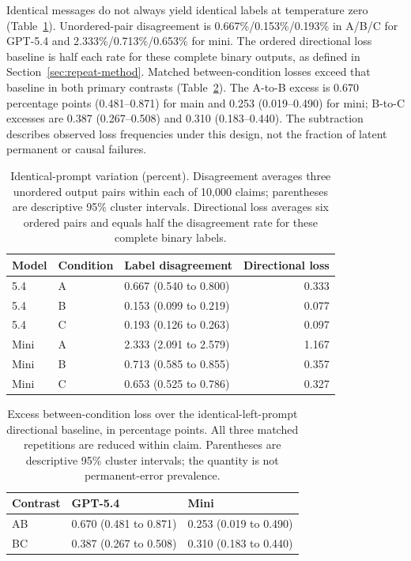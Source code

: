 \documentclass[11pt,letterpaper]{article}
\begin{document}
Identical messages do not always yield identical labels at temperature zero (Table~\ref{tab:variability}). Unordered-pair disagreement is 0.667\%/0.153\%/0.193\% in A/B/C for GPT-5.4 and 2.333\%/0.713\%/0.653\% for mini. The ordered directional loss baseline is half each rate for these complete binary outputs, as defined in Section~\ref{sec:repeat-method}. Matched between-condition losses exceed that baseline in both primary contrasts (Table~\ref{tab:excess}). The A-to-B excess is 0.670 percentage points (0.481--0.871) for main and 0.253 (0.019--0.490) for mini; B-to-C excesses are 0.387 (0.267--0.508) and 0.310 (0.183--0.440). The subtraction describes observed loss frequencies under this design, not the fraction of latent permanent or causal failures.

\begin{table}[htbp]\centering\small
\caption{Identical-prompt variation (percent). Disagreement averages three unordered output pairs within each of 10,000 claims; parentheses are descriptive 95\% cluster intervals. Directional loss averages six ordered pairs and equals half the disagreement rate for these complete binary labels.}\label{tab:variability}
\begin{tabularx}{\linewidth}{llXr}\toprule
Model & Condition & Label disagreement & Directional loss \\\midrule
5.4 & A & 0.667 (0.540 to 0.800) & 0.333 \\
5.4 & B & 0.153 (0.099 to 0.219) & 0.077 \\
5.4 & C & 0.193 (0.126 to 0.263) & 0.097 \\
Mini & A & 2.333 (2.091 to 2.579) & 1.167 \\
Mini & B & 0.713 (0.585 to 0.855) & 0.357 \\
Mini & C & 0.653 (0.525 to 0.786) & 0.327 \\
\bottomrule
\end{tabularx}
\end{table}

\begin{table}[htbp]\centering\small
\caption{Excess between-condition loss over the identical-left-prompt directional baseline, in percentage points. All three matched repetitions are reduced within claim. Parentheses are descriptive 95\% cluster intervals; the quantity is not permanent-error prevalence.}\label{tab:excess}
\begin{tabularx}{\linewidth}{lXX}\toprule
Contrast & GPT-5.4 & Mini \\\midrule
AB & 0.670 (0.481 to 0.871) & 0.253 (0.019 to 0.490) \\
BC & 0.387 (0.267 to 0.508) & 0.310 (0.183 to 0.440) \\
\bottomrule
\end{tabularx}
\end{table}
\end{document}
